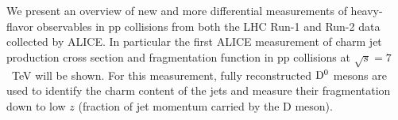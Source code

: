 \documentclass[12pt]{article}
\begin{document}
We present an overview of new and more differential measurements of heavy-flavor observables in pp collisions 
from both the LHC Run-1 and Run-2 data collected by ALICE. In particular the first ALICE measurement of charm jet production cross section 
and fragmentation function in pp collisions at $\sqrt{s}=7$~TeV will be shown. For this measurement, fully reconstructed ${\rm D}^0$ mesons are
used to identify the charm content of the jets and measure their fragmentation down to low $z$ (fraction of jet momentum carried by the D meson).
\end{document}
